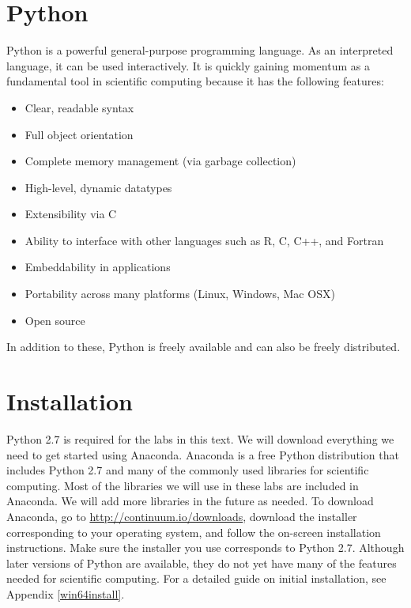 \label{lab:Essential_Python}

\section*{Python}
Python is a powerful general-purpose programming language. As an interpreted
language, it can be used interactively. 
It is quickly gaining momentum as a fundamental tool in scientific computing because it has the following features:
\begin{itemize}
\item Clear, readable syntax
\item Full object orientation
\item Complete memory management (via garbage collection)
\item High-level, dynamic datatypes
\item Extensibility via C
\item Ability to interface with other languages such as R, C, C++, and Fortran
\item Embeddability in applications
\item Portability across many platforms (Linux, Windows, Mac OSX)
\item Open source
\end{itemize}
In addition to these, Python is freely available and can also be freely distributed.

\section*{Installation}
Python 2.7 is required for the labs in this text. We will download everything we need to get started using Anaconda. Anaconda is a free Python distribution that includes Python 2.7 and many of the commonly used libraries for scientific computing. Most of the libraries we will use in these labs are included in Anaconda. We will add more libraries in the future as needed. To download Anaconda, go to \url{http://continuum.io/downloads}, download the installer corresponding to your operating system, and follow the on-screen installation instructions. Make sure the installer you use corresponds to Python 2.7. Although later versions of Python are available, they do not yet have many of the features needed for scientific computing. For a detailed guide on initial installation, see Appendix \ref{win64install}. 


